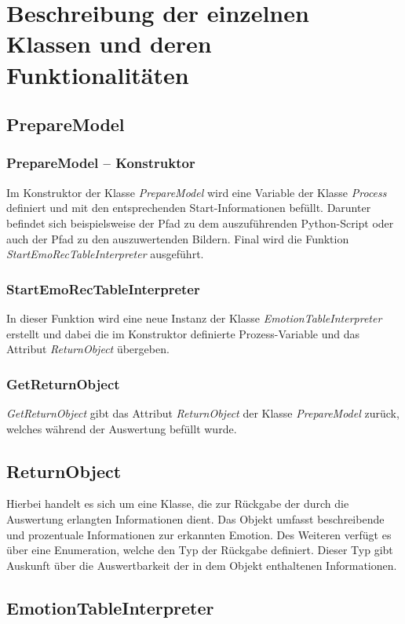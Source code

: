 \documentclass[10pt,a4paper]{report}
\begin{document}
\section{Beschreibung der einzelnen Klassen und deren Funktionalit\"{a}ten}
\subsection{PrepareModel}
\subsubsection{PrepareModel – Konstruktor}
Im Konstruktor der Klasse \textit{PrepareModel} wird eine Variable der Klasse \textit{Process} definiert und mit den entsprechenden Start-Informationen bef\"{u}llt. Darunter befindet sich beispielsweise der Pfad zu dem auszuf\"{u}hrenden Python-Script oder auch der Pfad zu den auszuwertenden Bildern. Final wird die Funktion \textit{StartEmoRecTableInterpreter} ausgef\"{u}hrt.
\subsubsection{StartEmoRecTableInterpreter}
In dieser Funktion wird eine neue Instanz der Klasse \textit{EmotionTableInterpreter} erstellt und dabei die im Konstruktor definierte Prozess-Variable und das Attribut \textit{ReturnObject} \"{u}bergeben.
\subsubsection{GetReturnObject}
\textit{GetReturnObject} gibt das Attribut \textit{ReturnObject} der Klasse \textit{PrepareModel} zur\"{u}ck, welches w\"{a}hrend der Auswertung bef\"{u}llt wurde. 
\subsection{ReturnObject}
Hierbei handelt es sich um eine Klasse, die zur R\"{u}ckgabe der durch die Auswertung erlangten Informationen dient. Das Objekt umfasst beschreibende und prozentuale Informationen zur erkannten Emotion. Des Weiteren verf\"{u}gt es \"{u}ber eine Enumeration, welche den Typ der R\"{u}ckgabe definiert. Dieser Typ gibt Auskunft \"{u}ber die Auswertbarkeit der in dem Objekt enthaltenen Informationen.
\subsection{EmotionTableInterpreter}
\end{document}
